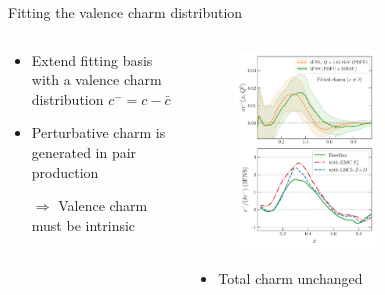 \documentclass[aspectratio=43, 8pt,t]{beamer}
\begin{document}
\begin{frame}{Fitting the valence charm distribution}
  \begin{columns}
    \begin{column}{0.49\columnwidth}
      \begin{itemize}
        \item Extend fitting basis with a valence charm distribution $c^-=c-\bar{c}$
        \item Perturbative charm is generated in pair production
        \item[$\Rightarrow$] Valence charm must be intrinsic
      \end{itemize}
    \end{column}
    \begin{column}{0.49\columnwidth}
      \begin{figure}
        \includegraphics[width=0.6\textwidth]{CharmAsymmetryMain-3FNS-Fig2Main.pdf}
      \end{figure}
      \begin{itemize}
        \item Total charm unchanged
      \end{itemize}
    \end{column}
  \end{columns}
\end{frame}
\end{document}
